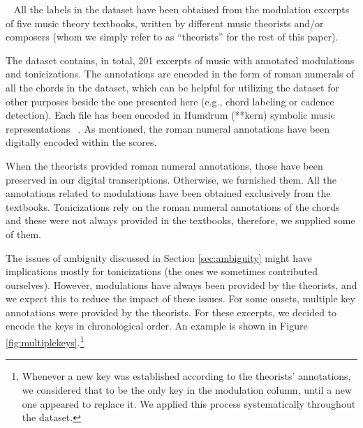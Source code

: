 ~\label{sec:dataset} All the labels in the
dataset have been obtained from the modulation excerpts of
five music theory textbooks, written by different music
theorists and/or composers (whom we simply refer to as
``theorists'' for the rest of this paper).

The dataset contains, in total, 201 excerpts of music with
annotated modulations and tonicizations. The annotations are
encoded in the form of roman numerals of all the chords in
the dataset, which can be helpful for utilizing the dataset
for other purposes beside the one presented here (e.g.,
chord labeling or cadence detection). Each file has been
encoded in Humdrum (**kern) symbolic music representations
~\parencite{huron02humdrum}. As mentioned, the roman numeral
annotations have been digitally encoded
\parencite{napoleslopez20harmalysis} within the scores.

When the theorists provided roman numeral annotations, those
have been preserved in our digital transcriptions.
Otherwise, we furnished them. All the annotations related to
modulations have been obtained exclusively from the
textbooks. Tonicizations rely on the roman numeral
annotations of the chords and these were not always provided
in the textbooks, therefore, we supplied some of them.

The issues of ambiguity discussed in Section
\ref{sec:ambiguity} might have implications mostly for
tonicizations (the ones we sometimes contributed ourselves).
However, modulations have always been provided by the
theorists, and we expect this to reduce the impact of these
issues. For some onsets, multiple key annotations were
provided by the theorists. For these excerpts, we decided to
encode the keys in chronological order. An example is shown
in Figure \ref{fig:multiplekeys}.\footnote{Whenever a new
key was established according to the theorists' annotations,
we considered that to be the only key in the modulation
column, until a new one appeared to replace it. We applied
this process systematically throughout the dataset.
}


